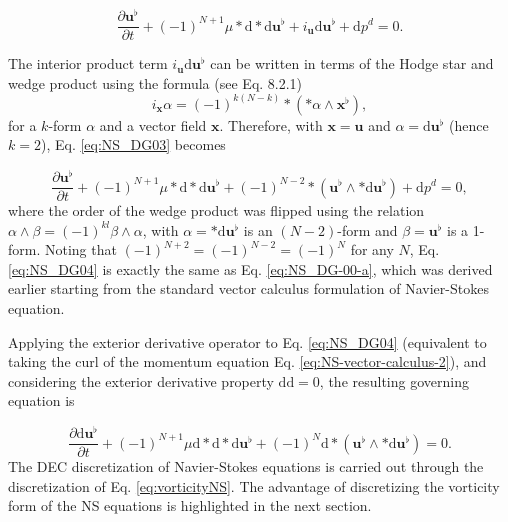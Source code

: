 \documentclass[final,12pt,times]{elsarticle}
\begin{document}
 
\begin{equation}
\label{eq:NS_DG03}
\frac{\partial \mathbf{u}^\flat}{\partial t} + (-1)^{N+1} \mu \ast \textrm{d} \ast \textrm{d} \mathbf{u}^\flat + i_{\mathbf{u}} \textrm{d} \mathbf{u}^\flat  + \textrm{d}p^d =0.  
\end{equation} 

The interior product term $i_{\mathbf{u}} \textrm{d} \mathbf{u}^\flat$ can be written in terms of the Hodge star and wedge product using the formula (see \cite{hirani2003discrete} Eq. 8.2.1)
\begin{equation}
\label{eq:interior-product}
i_{\mathbf{x}} \alpha = (-1)^{k(N-k)} \ast (\ast \alpha \wedge \mathbf{x}^\flat),  
\end{equation} 
for a $k$-form $\alpha$ and a vector field $\mathbf{x}$. Therefore, with $\mathbf{x} = \mathbf{u}$ and $\alpha = \textrm{d} \mathbf{u}^\flat$ (hence $k=2$), Eq. \eqref{eq:NS_DG03} becomes

\begin{equation}
\label{eq:NS_DG04}
\frac{\partial \mathbf{u}^\flat}{\partial t} + (-1)^{N+1} \mu \ast \textrm{d} \ast \textrm{d} \mathbf{u}^\flat + (-1)^{N-2} \ast(\mathbf{u}^\flat \wedge \ast \textrm{d} \mathbf{u}^\flat)  + \textrm{d}p^d =0,  
\end{equation} 
where the order of the wedge product was flipped using the relation $\alpha \wedge \beta = (-1)^{kl} \beta \wedge \alpha$, with $\alpha = \ast \textrm{d} \mathbf{u}^\flat$ is an $(N-2)$-form and $\beta = \mathbf{u}^\flat$ is a 1-form. Noting that $(-1)^{N+2} = (-1)^{N-2} = (-1)^{N}$ for any $N$, Eq. \eqref{eq:NS_DG04} is exactly the same as Eq. \eqref{eq:NS_DG-00-a}, which was derived earlier starting from the standard vector calculus formulation of Navier-Stokes equation.

Applying the exterior derivative operator to Eq. \eqref{eq:NS_DG04} (equivalent to taking the curl of the momentum equation Eq. \eqref{eq:NS-vector-calculus-2}), and considering the exterior derivative property $\textrm{d}\textrm{d}=0$, the resulting governing equation is

\begin{equation}
\label{eq:vorticityNS}
\frac{\partial \textrm{d} \mathbf{u}^\flat}{\partial t} + (-1)^{N+1} \mu \textrm{d} \ast \textrm{d} \ast \textrm{d} \mathbf{u}^\flat + (-1)^{N} \textrm{d} \ast(\mathbf{u}^\flat \wedge \ast \textrm{d} \mathbf{u}^\flat) =0. 
\end{equation}  
The DEC discretization of Navier-Stokes equations is carried out through the discretization of Eq. \eqref{eq:vorticityNS}. The advantage of discretizing the vorticity form of the NS equations is highlighted in the next section.
\end{document}
